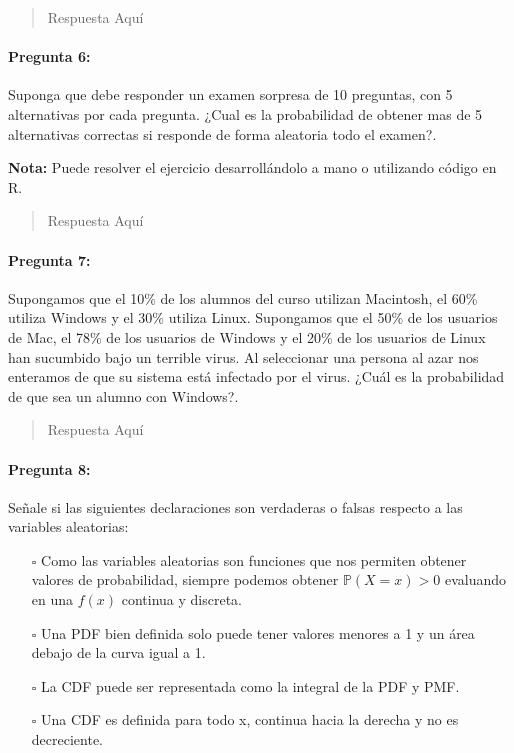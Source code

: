 \documentclass[]{article}
\providecommand{\tightlist}{%
  \setlength{\itemsep}{0pt}\setlength{\parskip}{0pt}}
\let\oldparagraph\paragraph
\renewcommand{\paragraph}[1]{\oldparagraph{#1}\mbox{}}
\begin{document}
\begin{quote}
Respuesta Aquí
\end{quote}

\hypertarget{pregunta-6}{%
\paragraph{\texorpdfstring{\textbf{Pregunta
6:}}{Pregunta 6:}}\label{pregunta-6}}

Suponga que debe responder un examen sorpresa de 10 preguntas, con 5
alternativas por cada pregunta. ¿Cual es la probabilidad de obtener mas
de 5 alternativas correctas si responde de forma aleatoria todo el
examen?.

\textbf{Nota:} Puede resolver el ejercicio desarrollándolo a mano o
utilizando código en R.

\begin{quote}
Respuesta Aquí
\end{quote}

\hypertarget{pregunta-7}{%
\paragraph{\texorpdfstring{\textbf{Pregunta
7:}}{Pregunta 7:}}\label{pregunta-7}}

Supongamos que el 10\% de los alumnos del curso utilizan Macintosh, el
60\% utiliza Windows y el 30\% utiliza Linux. Supongamos que el 50\% de
los usuarios de Mac, el 78\% de los usuarios de Windows y el 20\% de los
usuarios de Linux han sucumbido bajo un terrible virus. Al seleccionar
una persona al azar nos enteramos de que su sistema está infectado por
el virus. ¿Cuál es la probabilidad de que sea un alumno con Windows?.

\begin{quote}
Respuesta Aquí
\end{quote}

\hypertarget{pregunta-8}{%
\paragraph{\texorpdfstring{\textbf{Pregunta
8:}}{Pregunta 8:}}\label{pregunta-8}}

Señale si las siguientes declaraciones son verdaderas o falsas respecto
a las variables aleatorias:

\begin{itemize}
\tightlist
\item[$\square$]
  Como las variables aleatorias son funciones que nos permiten obtener
  valores de probabilidad, siempre podemos obtener \(\mathbb{P}(X=x)>0\)
  evaluando en una \(f(x)\) continua y discreta.
\item[$\square$]
  Una PDF bien definida solo puede tener valores menores a 1 y un área
  debajo de la curva igual a 1.
\item[$\square$]
  La CDF puede ser representada como la integral de la PDF y PMF.
\item[$\square$]
  Una CDF es definida para todo x, continua hacia la derecha y no es
  decreciente.
\end{itemize}
\end{document}
